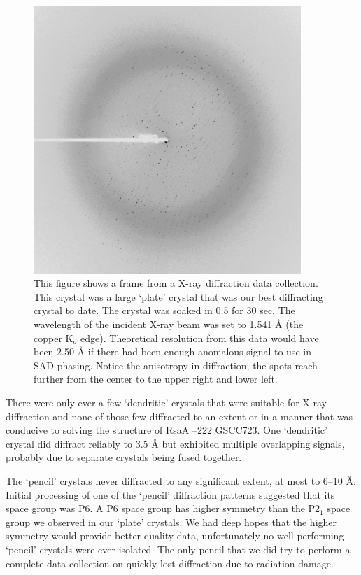 \begin{figure}[htb]
  	\begin{center}
   		\includegraphics[width=0.9\textwidth]{crystal_chapter/img/rsaadiffraction.pdf}
   	\end{center}
   	\caption[A diffraction pattern of RsaA --222, `plate' crystal]{This figure shows a frame from a X-ray diffraction data collection. 
This crystal was a large `plate' crystal that was our best diffracting crystal to date. The crystal was soaked in 0.5
 \si{\molar} 
for 30 sec. The wavelength of the incident X-ray beam was set to 1.541 \AA{} (the copper K$_{a}$ edge). Theoretical resolution from this data would have been 2.50 \AA{} if there had been enough anomalous signal to use in \ac{SAD} phasing. Notice the anisotropy in diffraction, \ie the spots reach further from the center to the upper right and lower left.}
   	\label{fig:diffraction}
\end{figure}   

There were only ever a few `dendritic' crystals that were suitable for X-ray diffraction and none of those few diffracted to an extent or in a manner that was conducive to solving the structure of RsaA --222 GSCC723. One `dendritic' crystal did diffract reliably to 3.5 \AA{} but exhibited multiple overlapping signals, probably due to separate crystals being fused together.  

The `pencil' crystals never diffracted to any significant extent, at most to 6--10 \AA{}. Initial processing of one of the `pencil' diffraction patterns suggested that its space group was P6. A P6 space group has higher symmetry than the P2$_{1}$ space group we observed in our `plate' crystals. We had deep hopes that the higher symmetry would provide better quality data, unfortunately no well performing `pencil' crystals were ever isolated. The only pencil that we did try to perform a complete data collection on quickly lost diffraction due to radiation damage.

